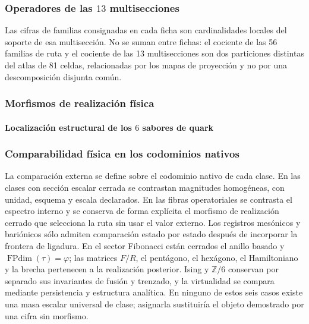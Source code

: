 
\subsubsection{Operadores de las \(13\) multisecciones}

Las cifras de familias consignadas en cada ficha son cardinalidades locales del
soporte de esa multisección. No se suman entre fichas: el cociente de las
56 familias de ruta y el cociente de las 13 multisecciones son dos particiones
distintas del atlas de 81 celdas, relacionadas por los mapas de proyección y no
por una descomposición disjunta común.



\subsubsection{Morfismos de realización física}




\paragraph{Localización estructural de los \(6\) sabores de quark}




\subsubsection{Comparabilidad física en los codominios nativos}

La comparación externa se define sobre el codominio nativo de cada clase. En las
clases con sección escalar cerrada se contrastan magnitudes homogéneas, con unidad,
esquema y escala declarados. En las fibras operatoriales se contrasta el espectro
interno y se conserva de forma explícita el morfismo de realización cerrado que
selecciona la ruta sin usar el valor externo. Los registros mesónicos y bariónicos sólo admiten comparación estado por
estado después de incorporar la frontera de ligadura. En el sector Fibonacci están
cerrados el anillo basado y \(\operatorname{FPdim}(\tau)=\varphi\); las matrices
\(F/R\), el pentágono, el hexágono, el Hamiltoniano y la brecha pertenecen a la
realización posterior. Ising y \(\mathbb Z/6\) conservan por separado sus invariantes
de fusión y trenzado, y la virtualidad se compara mediante persistencia y estructura
analítica. En ninguno de estos seis
casos existe una masa escalar universal de clase; asignarla sustituiría el objeto
demostrado por una cifra sin morfismo.
